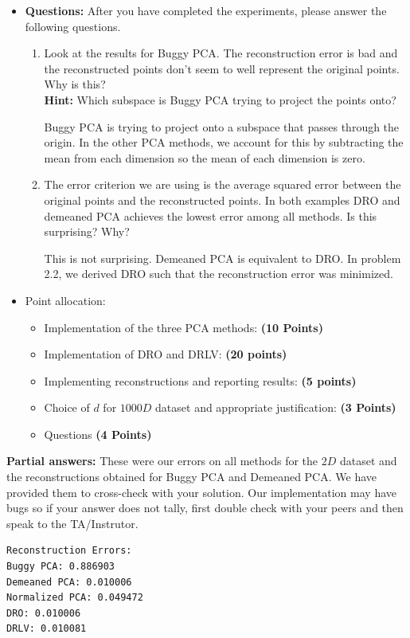 \begin{itemize}
\item \textbf{Questions:} After you have completed the experiments, please answer the following questions.
\begin{enumerate}
\item Look at the results for Buggy PCA. The reconstruction error is bad and the
reconstructed points don't seem to well represent the original points. Why is
this? \\
\textbf{Hint: } Which subspace is Buggy PCA trying to project the points
onto?

\begin{soln}
  Buggy PCA is trying to project onto a subspace that passes through the origin.
  In the other PCA methods, we account for this by subtracting the mean from each dimension so the mean of each dimension is zero.
\end{soln}

\item The error criterion we are using is the average squared error 
between the original points and the reconstructed points.
In both examples DRO and demeaned PCA achieves the lowest error among all
methods. 
Is this surprising? Why?

\begin{soln}
  This is not surprising.
  Demeaned PCA is equivalent to DRO.
  In problem 2.2, we derived DRO such that the reconstruction error was minimized.
\end{soln}

\end{enumerate}

\item Point allocation:
\begin{itemize}
\item Implementation of the three PCA methods: \textbf{(10 Points)}
\item Implementation of DRO and DRLV: \textbf{(20 points)}
\item Implementing reconstructions and reporting results: \textbf{(5 points)}
\item Choice of $d$ for $1000D$ dataset and appropriate justification:
\textbf{(3 Points)}
\item Questions \textbf{(4 Points)}
\end{itemize}

\end{itemize}



\textbf{Partial answers:}
These were our errors on all methods for the $2D$ dataset and the reconstructions obtained for Buggy PCA and Demeaned PCA.
We have provided them to cross-check with your solution.
Our implementation may have bugs so if your answer does not tally, first double check with your peers and then speak to the TA/Instrutor.
\begin{verbatim}
Reconstruction Errors:
Buggy PCA: 0.886903
Demeaned PCA: 0.010006
Normalized PCA: 0.049472
DRO: 0.010006
DRLV: 0.010081
\end{verbatim}

